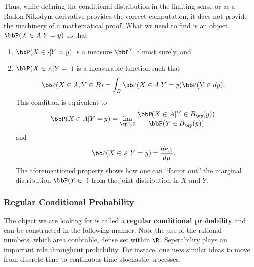 \documentclass{report}
\begin{document}
Thus, while defining the conditional distribution in the limiting sense or as a Radon-Nikodym derivative provides the correct computation, it does not provide the machinery of a mathematical proof.  What we need to find is an object $\bbP(X \in A | Y = y)$ so that
\begin{enumerate}
\item $\bbP(X \in \cdot | Y = y)$ is a measure $\bbP^Y$ almost surely, and
\item $\bbP(X \in A | Y = \cdot)$ is a measurable function such that
\[
\bbP(X \in A, Y \in B) = \int_B \bbP(X \in A | Y = y) \bbP(Y \in dy).
\]
This condition is equivalent to
\[
\bbP(X \in A | Y = y) = \lim_{\ep \searrow 0} \frac{\bbP(X \in A | Y \in B_\ep(y))}{\bbP(Y \in B_\ep(y))}
\]
and
\[
\bbP(X \in A | Y = y) = \frac{d \nu_A}{d \mu}.
\]
The aforementioned property shows how one can ``factor out'' the marginal distribution $\bbP(Y \in \cdot)$ from the joint distribution in $X$ and $Y$.
\end{enumerate}

\subsubsection{Regular Conditional Probability}
The object we are looking for is called a \textbf{regular conditional probability} and can be constructed in the following manner.  Note the use of the rational numbers, which area coubtable, dense set within $\R$.  Seperability plays an important role throughout probability.  For instace, one uses similar ideas to move from discrete time to continuous time stochastic processes.
\end{document}
